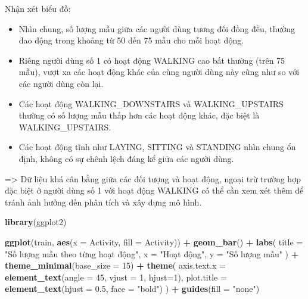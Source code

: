 \documentclass[
]{article}
\newenvironment{Shaded}{\begin{snugshade}}{\end{snugshade}}
\newcommand{\AttributeTok}[1]{\textcolor[rgb]{0.13,0.29,0.53}{#1}}
\newcommand{\DecValTok}[1]{\textcolor[rgb]{0.00,0.00,0.81}{#1}}
\newcommand{\FloatTok}[1]{\textcolor[rgb]{0.00,0.00,0.81}{#1}}
\newcommand{\FunctionTok}[1]{\textcolor[rgb]{0.13,0.29,0.53}{\textbf{#1}}}
\newcommand{\NormalTok}[1]{#1}
\newcommand{\SpecialCharTok}[1]{\textcolor[rgb]{0.81,0.36,0.00}{\textbf{#1}}}
\newcommand{\StringTok}[1]{\textcolor[rgb]{0.31,0.60,0.02}{#1}}
\begin{document}
Nhận xét biểu đồ:

\begin{itemize}
\item
  Nhìn chung, số lượng mẫu giữa các người dùng tương đối đồng đều,
  thường dao động trong khoảng từ 50 đến 75 mẫu cho mỗi hoạt động.
\item
  Riêng người dùng số 1 có hoạt động WALKING cao bất thường (trên 75
  mẫu), vượt xa các hoạt động khác của cùng người dùng này cũng như so
  với các người dùng còn lại.
\item
  Các hoạt động WALKING\_DOWNSTAIRS và WALKING\_UPSTAIRS thường có số
  lượng mẫu thấp hơn các hoạt động khác, đặc biệt là WALKING\_UPSTAIRS.
\item
  Các hoạt động tĩnh như LAYING, SITTING và STANDING nhìn chung ổn định,
  không có sự chênh lệch đáng kể giữa các người dùng.
\end{itemize}

=\textgreater{} Dữ liệu khá cân bằng giữa các đối tượng và hoạt động,
ngoại trừ trường hợp đặc biệt ở người dùng số 1 với hoạt động WALKING có
thể cần xem xét thêm để tránh ảnh hưởng đến phân tích và xây dựng mô
hình.

\begin{Shaded}
\begin{Highlighting}[]
\FunctionTok{library}\NormalTok{(ggplot2)}

\FunctionTok{ggplot}\NormalTok{(train, }\FunctionTok{aes}\NormalTok{(}\AttributeTok{x =}\NormalTok{ Activity, }\AttributeTok{fill =}\NormalTok{ Activity)) }\SpecialCharTok{+}
  \FunctionTok{geom\_bar}\NormalTok{() }\SpecialCharTok{+}
  \FunctionTok{labs}\NormalTok{(}
    \AttributeTok{title =} \StringTok{"Số lượng mẫu theo từng hoạt động"}\NormalTok{,}
    \AttributeTok{x =} \StringTok{"Hoạt động"}\NormalTok{,}
    \AttributeTok{y =} \StringTok{"Số lượng mẫu"}
\NormalTok{  ) }\SpecialCharTok{+}
  \FunctionTok{theme\_minimal}\NormalTok{(}\AttributeTok{base\_size =} \DecValTok{15}\NormalTok{) }\SpecialCharTok{+}
  \FunctionTok{theme}\NormalTok{(}
    \AttributeTok{axis.text.x =} \FunctionTok{element\_text}\NormalTok{(}\AttributeTok{angle =} \DecValTok{45}\NormalTok{, }\AttributeTok{vjust =} \DecValTok{1}\NormalTok{, }\AttributeTok{hjust=}\DecValTok{1}\NormalTok{),}
    \AttributeTok{plot.title =} \FunctionTok{element\_text}\NormalTok{(}\AttributeTok{hjust =} \FloatTok{0.5}\NormalTok{, }\AttributeTok{face =} \StringTok{"bold"}\NormalTok{)}
\NormalTok{  ) }\SpecialCharTok{+}
  \FunctionTok{guides}\NormalTok{(}\AttributeTok{fill =} \StringTok{"none"}\NormalTok{)}
\end{Highlighting}
\end{Shaded}
\end{document}
